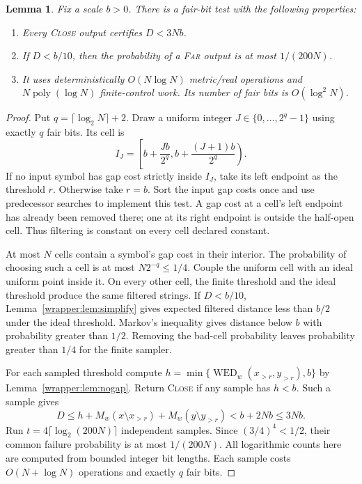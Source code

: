 \documentclass[11pt]{article}
\newtheorem{lemma}[theorem]{Lemma}
\theoremstyle{definition}
\newcommand{\WED}{\operatorname{WED}}
\newcommand{\1}{\mathbf 1}
\begin{document}
\begin{lemma}\label{wrapper:lem:test}
Fix a scale $b>0$. There is a fair-bit test with the following properties:
\begin{enumerate}
\item Every \textup{\textsc{Close}} output certifies $D<3Nb$.
\item If $D<b/10$, then the probability of a \textup{\textsc{Far}} output is at most
      $1/(200N)$.
\item It uses deterministically $O(N\log N)$ metric/real operations and $N\operatorname{poly}(\log N)$ finite-control work. Its number
      of fair bits is $O(\log^2N)$.
\end{enumerate}
\end{lemma}
\begin{proof}
Put $q=\lceil\log_2N\rceil+2$. Draw a uniform integer
$J\in\{0,\ldots,2^q-1\}$ using exactly $q$ fair bits. Its cell is
\[
I_J=\left[b+\frac{Jb}{2^q},b+\frac{(J+1)b}{2^q}\right).
\]
If no input symbol has gap cost strictly inside $I_J$, take its left endpoint
as the threshold $r$. Otherwise take $r=b$. Sort the input gap costs
once and use predecessor searches to implement this test.
A gap cost at a cell's left endpoint has already been removed there;
one at its right endpoint is outside the half-open cell. Thus filtering
is constant on every cell declared constant.

At most $N$ cells contain a symbol's gap cost in their interior.
The probability of choosing such a cell is at most $N2^{-q}\le1/4$.
Couple the uniform cell with an ideal uniform point inside it.
On every other cell, the finite threshold and the ideal threshold
produce the same filtered strings.
If $D<b/10$, Lemma~\ref{wrapper:lem:simplify} gives expected filtered
distance less than $b/2$ under the ideal threshold.
Markov's inequality gives distance below $b$ with probability greater
than $1/2$. Removing the bad-cell probability leaves probability greater
than $1/4$ for the finite sampler.

For each sampled threshold compute
$h=\min\{\WED_w(x_{>r},y_{>r}),b\}$ by Lemma~\ref{wrapper:lem:nogap}.
Return \textup{\textsc{Close}} if any sample has $h<b$. Such a sample gives
\[
D\le h+M_w(x\setminus x_{>r})+M_w(y\setminus y_{>r})
<b+2Nb\le3Nb.
\]
Run $t=4\lceil\log_2(200N)\rceil$ independent samples. Since
$(3/4)^4<1/2$, their common failure probability is at most $1/(200N)$.
All logarithmic counts here are computed from bounded integer bit lengths.
Each sample costs $O(N+\log N)$ operations and exactly $q$ fair bits.
\end{proof}
\end{document}
